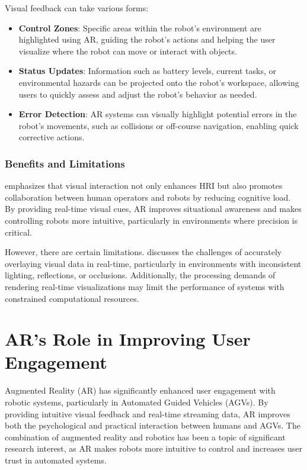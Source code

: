 Visual feedback can take various forms:
\begin{itemize}
    \item \textbf{Control Zones}: Specific areas within the robot's environment are highlighted using AR, guiding the robot's actions and helping the user visualize where the robot can move or interact with objects.
    \item \textbf{Status Updates}: Information such as battery levels, current tasks, or environmental hazards can be projected onto the robot’s workspace, allowing users to quickly assess and adjust the robot’s behavior as needed.
    \item \textbf{Error Detection}: AR systems can visually highlight potential errors in the robot's movements, such as collisions or off-course navigation, enabling quick corrective actions.
\end{itemize}

\subsubsection{Benefits and Limitations}

\cite{Suzuki2022} emphasizes that visual interaction not only enhances HRI but also promotes collaboration between human operators and robots by reducing cognitive load. By providing real-time visual cues, AR improves situational awareness and makes controlling robots more intuitive, particularly in environments where precision is critical.

However, there are certain limitations. \cite{Daponte2020} discusses the challenges of accurately overlaying visual data in real-time, particularly in environments with inconsistent lighting, reflections, or occlusions. Additionally, the processing demands of rendering real-time visualizations may limit the performance of systems with constrained computational resources.

\section{AR's Role in Improving User Engagement}

Augmented Reality (AR) has significantly enhanced user engagement with robotic systems, particularly in Automated Guided Vehicles (AGVs). By providing intuitive visual feedback and real-time streaming data, AR improves both the psychological and practical interaction between humans and AGVs. The combination of augmented reality and robotics has been a topic of significant research interest, as AR makes robots more intuitive to control and increases user trust in automated systems.

